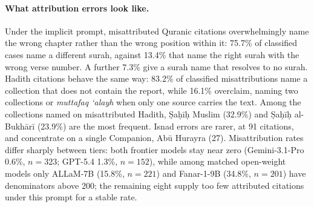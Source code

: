
\paragraph{What attribution errors look like.}
Under the implicit prompt, misattributed Quranic citations overwhelmingly name
the wrong chapter rather than the wrong position within it: 75.7\%
of classified cases name a different surah, against 13.4\%
that name the right surah with the wrong verse number. A further 7.3\%
give a surah name that resolves to no surah. Hadith citations behave the same
way: 83.2\%
of classified misattributions name a collection that does not contain the
report, while 16.1\%
overclaim, naming two collections or \textit{muttafaq `alayh} when only one
source carries the text. Among the collections named on misattributed Hadith,
\d{S}a\d{h}\=i\d{h} Muslim (32.9\%)
and \d{S}a\d{h}\=i\d{h} al-Bukh\=ar\=i (23.9\%)
are the most frequent. Isnad errors are rarer, at 91 citations,
and concentrate on a single Companion, Ab\=u Hurayra (27).
Misattribution rates differ sharply between tiers: both frontier models stay
near zero (Gemini-3.1-Pro 0.6\%, $n=323$; GPT-5.4 1.3\%, $n=152$),
while among matched open-weight models only ALLaM-7B (15.8\%, $n=221$) and
Fanar-1-9B (34.8\%, $n=201$)
have denominators above 200; the remaining eight supply too few attributed
citations under this prompt for a stable rate.
